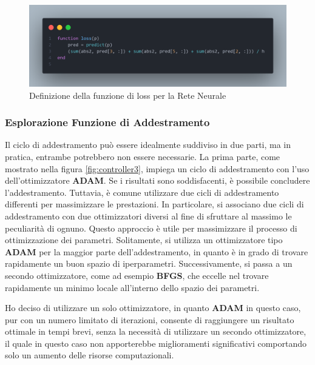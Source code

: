 \begin{figure}[H]
    \begin{center}
		\includegraphics[width=\textwidth]{img/loss.png}
		\caption{Definizione della funzione di loss per la Rete Neurale}
		\label{fig:lossFunction}
	\end{center}
\end{figure}

\subsubsection{Esplorazione Funzione di Addestramento}

Il ciclo di addestramento può essere idealmente suddiviso in due parti, 
ma in pratica, entrambe potrebbero non essere necessarie. 
La prima parte, come mostrato nella figura \ref{fig:controller3}, 
impiega un ciclo di addestramento con l'uso dell'ottimizzatore 
\textbf{ADAM}. Se i risultati sono soddisfacenti, è possibile 
concludere l'addestramento. Tuttavia, è comune utilizzare due cicli 
di addestramento differenti per massimizzare le prestazioni. 
In particolare, si associano due cicli di addestramento con due 
ottimizzatori diversi al fine di sfruttare al massimo le peculiarità 
di ognuno. Questo approccio è utile per massimizzare il processo di 
ottimizzazione dei parametri. Solitamente, si utilizza un 
ottimizzatore tipo \textbf{ADAM} per la maggior parte dell'addestramento, 
in quanto è in grado di trovare rapidamente un buon spazio di iperparametri. 
Successivamente, si passa a un secondo ottimizzatore, come ad esempio 
\textbf{BFGS}, che eccelle nel trovare rapidamente un minimo locale 
all'interno dello spazio dei parametri.

Ho deciso di utilizzare un solo ottimizzatore, in quanto \textbf{ADAM} 
in questo caso, pur con un numero limitato di iterazioni, consente di 
raggiungere un risultato ottimale in tempi brevi, senza la necessità di 
utilizzare un secondo ottimizzatore, il quale in questo caso non 
apporterebbe miglioramenti significativi comportando solo un aumento 
delle risorse computazionali.

